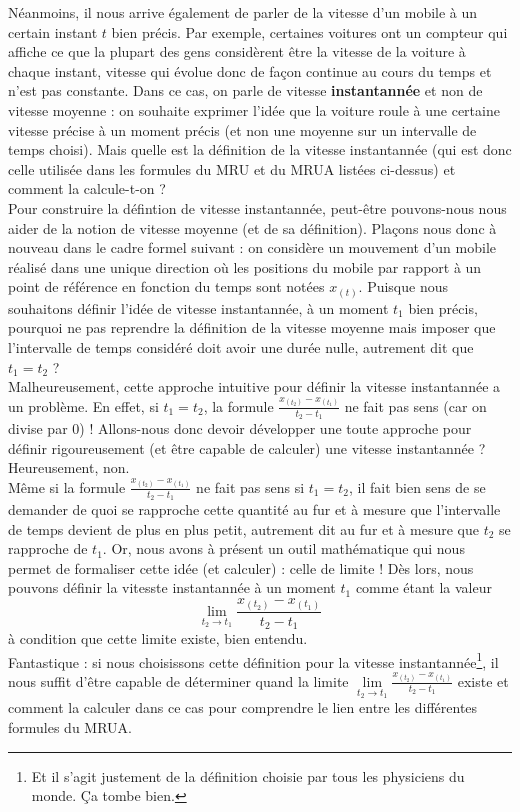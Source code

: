 \documentclass[a4paper,fontsize=13pt]{scrreprt}
\theoremstyle{plain}
\theoremstyle{definition}
\begin{document}
Néanmoins, il nous arrive également de parler de la vitesse d'un mobile à un certain instant $t$ bien précis. Par exemple, certaines voitures ont un compteur qui affiche ce que la plupart des gens considèrent être la vitesse de la voiture à chaque instant, vitesse qui évolue donc de façon continue au cours du temps et n'est pas constante. Dans ce cas, on parle de vitesse \textbf{instantannée} et non de vitesse moyenne : on souhaite exprimer l'idée que la voiture roule à une certaine vitesse précise à un moment précis (et non une moyenne sur un intervalle de temps choisi). Mais quelle est la définition de la vitesse instantannée (qui est donc celle utilisée dans les formules du MRU et du MRUA listées ci-dessus) et comment la calcule-t-on ? \\
Pour construire la défintion de vitesse instantannée, peut-être pouvons-nous nous aider de la notion de vitesse moyenne (et de sa définition). Plaçons nous donc à nouveau dans le cadre formel suivant : on considère un mouvement d'un mobile réalisé dans une unique direction où les positions du mobile par rapport à un point de référence en fonction du temps sont notées $x_{(t)}$. Puisque nous souhaitons définir l'idée de vitesse instantannée, à un moment $t_1$ bien précis, pourquoi ne pas reprendre la définition de la vitesse moyenne mais imposer que l'intervalle de temps considéré doit avoir une durée nulle, autrement dit que $t_1 = t_2$ ? \\
Malheureusement, cette approche intuitive pour définir la vitesse instantannée a un problème. En effet, si $t_1 = t_2$, la formule $\frac{x_{(t_2)} - x_{(t_1)}}{t_2 - t_1}$ ne fait pas sens (car on divise par $0$) ! Allons-nous donc devoir développer une toute approche pour définir rigoureusement (et être capable de calculer) une vitesse instantannée ? Heureusement, non. \\
Même si la formule $\frac{x_{(t_2)} - x_{(t_1)}}{t_2 - t_1}$ ne fait pas sens si $t_1 = t_2$, il fait bien sens de se demander de quoi se rapproche cette quantité au fur et à mesure que l'intervalle de temps devient de plus en plus petit, autrement dit au fur et à mesure que $t_2$ se rapproche de $t_1$. Or, nous avons à présent un outil mathématique qui nous permet de formaliser cette idée (et calculer) : celle de limite ! Dès lors, nous pouvons définir la vitesste instantannée à un moment $t_1$ comme étant la valeur $$\lim\limits_{t_2 \to t_1} \frac{x_{(t_2)} - x_{(t_1)}}{t_2 - t_1}$$
à condition que cette limite existe, bien entendu. \\
Fantastique : si nous choisissons cette définition pour la vitesse instantannée\footnote{Et il s'agit justement de la définition choisie par tous les physiciens du monde. \c{C}a tombe bien.}, il nous suffit d'être capable de déterminer quand la limite $\lim\limits_{t_2 \to t_1} \frac{x_{(t_2)} - x_{(t_1)}}{t_2 - t_1}$ existe et comment la calculer dans ce cas pour comprendre le lien entre les différentes formules du MRUA. \\
\end{document}
